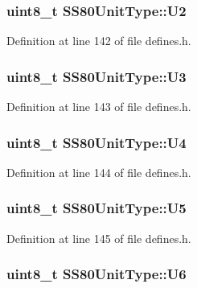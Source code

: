 \subsubsection[{\texorpdfstring{U2}{U2}}]{\setlength{\rightskip}{0pt plus 5cm}uint8\+\_\+t S\+S80\+Unit\+Type\+::\+U2}\hypertarget{structSS80UnitType_a0f8959345241baa6f0fb5b17bf15d9e6}{}\label{structSS80UnitType_a0f8959345241baa6f0fb5b17bf15d9e6}


Definition at line 142 of file defines.\+h.

\subsubsection[{\texorpdfstring{U3}{U3}}]{\setlength{\rightskip}{0pt plus 5cm}uint8\+\_\+t S\+S80\+Unit\+Type\+::\+U3}\hypertarget{structSS80UnitType_a0dd8387c09ade023e9fc2bcde07fb4b1}{}\label{structSS80UnitType_a0dd8387c09ade023e9fc2bcde07fb4b1}


Definition at line 143 of file defines.\+h.

\subsubsection[{\texorpdfstring{U4}{U4}}]{\setlength{\rightskip}{0pt plus 5cm}uint8\+\_\+t S\+S80\+Unit\+Type\+::\+U4}\hypertarget{structSS80UnitType_ae7248c3b6cdf02493c0be621f8f9a93f}{}\label{structSS80UnitType_ae7248c3b6cdf02493c0be621f8f9a93f}


Definition at line 144 of file defines.\+h.

\subsubsection[{\texorpdfstring{U5}{U5}}]{\setlength{\rightskip}{0pt plus 5cm}uint8\+\_\+t S\+S80\+Unit\+Type\+::\+U5}\hypertarget{structSS80UnitType_a8c9860252085e8de68f08d5148428832}{}\label{structSS80UnitType_a8c9860252085e8de68f08d5148428832}


Definition at line 145 of file defines.\+h.

\subsubsection[{\texorpdfstring{U6}{U6}}]{\setlength{\rightskip}{0pt plus 5cm}uint8\+\_\+t S\+S80\+Unit\+Type\+::\+U6}\hypertarget{structSS80UnitType_a04fb8175375dd46cd891596756196584}{}\label{structSS80UnitType_a04fb8175375dd46cd891596756196584}


